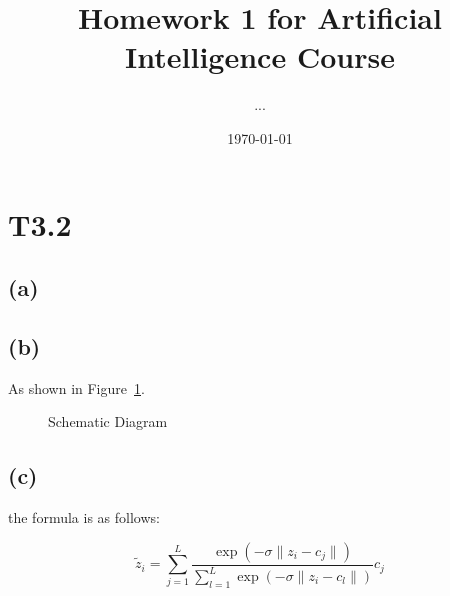 \documentclass[]{article}
\title{Homework 1 for Artificial Intelligence Course}
\author{...}
\date{\today}
\begin{document}
\maketitle

\section*{T3.2}

\subsection*{(a)}
\lipsum[11]   %

\subsection*{(b)}
\lipsum[11]   %
As shown in Figure~\ref{fig1}.

\begin{figure}[H]	\centering
	\vfill
	\qquad
	\caption{Schematic Diagram}
	\label{fig1} 
\end{figure}

\subsection*{(c)}
\lipsum[11]   %
the formula is as follows:

\begin{equation} \label{eq:softquant}
\tilde{z}_i = \sum_{j=1}^L \frac{\exp(-\sigma\|z_i-c_j\|)}{\sum_{l=1}^L \exp(-\sigma\|z_i-c_l\|)} c_j
\end{equation}
\end{document}
